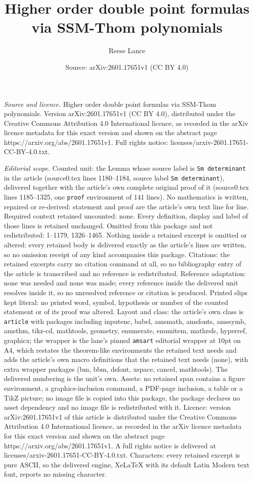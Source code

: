 \documentclass[10pt,a4paper]{amsart}
\title[Higher order double point formulas via SSM-Thom polynomials]{Higher order double point formulas via SSM-Thom polynomials}
\author{Reese Lance}
\date{Source: arXiv:2601.17651v1 (CC BY 4.0)}
\begin{document}
\maketitle

\noindent\emph{Source and licence.} Higher order double point formulas via SSM-Thom polynomials. Version arXiv:2601.17651v1 (CC BY 4.0), distributed under the Creative Commons Attribution 4.0 International licence, as recorded in the arXiv licence metadata for this exact version and shown on the abstract page https://arxiv.org/abs/2601.17651v1. Full rights notice: licenses/arxiv-2601.17651-CC-BY-4.0.txt.\par\smallskip

\noindent\textit{Editorial scope.} Counted unit: the Lemma whose source label is \texttt{Sm determinant} in the article (source0.tex lines 1180--1184, source label \texttt{Sm determinant}), delivered together with the article's own complete original proof of it (source0.tex lines 1185--1325, one \texttt{proof} environment of 141 lines). No mathematics is written, repaired or re-derived: statement and proof are the article's own text line for line. Required context retained uncounted: none. Every definition, display and label of those lines is retained unchanged. Omitted from this package and not redistributed: 1--1179, 1326--1465. Nothing inside a retained excerpt is omitted or altered: every retained body is delivered exactly as the article's lines are written, so no omission receipt of any kind accompanies this package. Citations: the retained excerpts carry no citation command at all, so no bibliography entry of the article is transcribed and no reference is redistributed. Reference adaptation: none was needed and none was made; every reference inside the delivered unit resolves inside it, so no unresolved reference or citation is produced. Printed slips kept literal: no printed word, symbol, hypothesis or number of the counted statement or of its proof was altered. Layout and class: the article's own class is \texttt{article} with packages including inputenc, babel, amsmath, amsfonts, amssymb, amsthm, tikz-cd, mathtools, geometry, enumerate, enumitem, mathrsfs, hyperref, graphicx; the wrapper is the lane's pinned \texttt{amsart} editorial wrapper at 10pt on A4, which restates the theorem-like environments the retained text needs and adds the article's own macro definitions that the retained text needs (none), with extra wrapper packages (bm, bbm, dsfont, xspace, cancel, mathtools). The delivered numbering is the unit's own. Assets: no retained span contains a figure environment, a graphics-inclusion command, a PDF-page inclusion, a table or a TikZ picture; no image file is copied into this package, the package declares no asset dependency and no image file is redistributed with it. Licence: version arXiv:2601.17651v1 of this article is distributed under the Creative Commons Attribution 4.0 International licence, as recorded in the arXiv licence metadata for this exact version and shown on the abstract page https://arxiv.org/abs/2601.17651v1. A full rights notice is delivered at licenses/arxiv-2601.17651-CC-BY-4.0.txt. Characters: every retained excerpt is pure ASCII, so the delivered engine, XeLaTeX with its default Latin Modern text font, reports no missing character.
\end{document}
